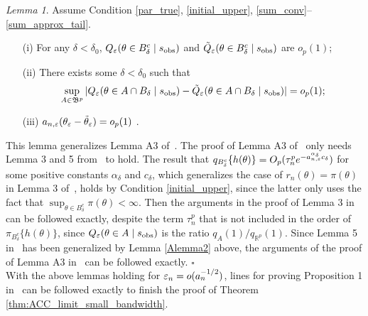 \documentclass[9pt]{article}
\theoremstyle{remark}
\newtheorem{lemma}{Lemma}
\begin{document}
\begin{lemma}\label{Alemma4} 
Assume Condition \ref{par_true}, \ref{initial_upper}, \ref{sum_conv}--\ref{sum_approx_tail}. 
	\begin{enumerate}
		\item[(i)] For any $\delta<\delta_{0}$, $Q_{\varepsilon}(\theta\in B_{\delta}^{c}\mid s_{\rm obs})$
		and $\tilde{Q}_{\varepsilon}(\theta\in B_{\delta}^{c}\mid s_{\rm obs})$ are $o_{p}(1)$; 
		\item[(ii)] There exists some $\delta<\delta_{0}$ such that 
		\[
		\sup_{A\in\mathfrak{B}^{p}}|Q_{\varepsilon}(\theta\in A\cap B_{\delta}\mid s_{\rm obs})-\tilde{Q}_{\varepsilon}(\theta\in A\cap B_{\delta}\mid s_{\rm obs})|=o_{p}(1);
		\]
		\item[(iii)] $a_{n,\varepsilon}(\theta_{\varepsilon}-\tilde{\theta}_{\varepsilon})=o_{p}(1)$ . 
	\end{enumerate}\end{lemma}
	This lemma generalizes Lemma A3 of~\cite{Li2017}. The proof of Lemma A3 of~\cite{Li2017} only needs Lemma 3 and 5 from~\cite{Li2016} to hold. The result that  $q_{B_{\delta}^{c}}\{h(\theta)\}=O_{p}(\tau_{n}^{p}e^{-a_{n,\varepsilon}^{\alpha_{\delta}}c_{\delta}})$
	for some positive constants $\alpha_{\delta}$ and $c_{\delta}$, which generalizes the case of $r_{n}(\theta)=\pi(\theta)$ in Lemma 3 of~\cite{Li2016}, holds by Condition \ref{initial_upper}, since the latter only uses the fact that 
	$\sup_{\theta\in B_{\delta}^{c}}\pi(\theta)<\infty$.
	Then the arguments in the proof of Lemma 3 in~\cite{Li2016} can be followed exactly, despite the term $\tau_{n}^{p}$ that is not included in the order of $\pi_{B_{\delta}^{c}}\{h(\theta)\}$, since $Q_{\varepsilon}(\theta\in A\mid s_{{\rm obs}})$
	is the ratio $q_{A}(1)/q_{\mathbb{R}^{p}}(1)$. Since Lemma 5 in~\cite{Li2016} has been generalized by Lemma \eqref{Alemma2} above, the arguments of the proof of Lemma A3 in~\cite{Li2017} can be followed exactly.
	\hfill{$\square$} \\
	

With the above lemmas holding for $\varepsilon_n = o(a_n^{-1/2})$, lines for
proving %
Proposition 1 in~\cite{Li2017} can be followed  
exactly to finish the proof of Theorem \ref{thm:ACC_limit_small_bandwidth}. 
\end{document}
